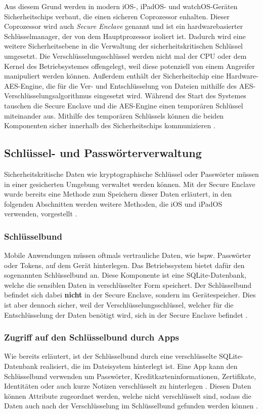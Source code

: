 Aus diesem Grund werden in modern iOS-, iPadOS- und watchOS-Geräten Sicherheitschips verbaut, die einen sicheren
Coprozessor enhalten. Dieser Coprozessor wird auch \textit{Secure Enclave} genannt und ist ein hardwarebasierter 
Schlüsselmanager, der von dem Hauptprozessor isoliert ist. Dadurch wird eine weitere Sicherheitsebene in die 
Verwaltung der sicherheitskritischen Schlüssel umgesetzt. Die Verschlüsselungsschlüssel werden nicht mal
der CPU oder dem Kernel des Betriebsystemes offengelegt, weil diese potenziell von einem Angreifer manipuliert
werden können. Außerdem enthält der Sicherheitschip eine Hardware-AES-Engine, die für die Ver- und Entschlüsselung
von Dateien mithilfe des AES-Verschlüsselungsalgorithmus eingesetzt wird. Während des Start des Systemes tauschen
die Secure Enclave und die AES-Engine einen temporären Schlüssel miteinander aus. Mithilfe des temporären Schlüssels
können die beiden Komponenten sicher innerhalb des Sicherheitschips
kommunizieren \cite{apple2020hardware_security,apple2020}.

\subsection{Schlüssel- und Passwörterverwaltung}
Sicherheitskritische Daten wie kryptographische Schlüssel oder Passwörter müssen in einer gesicherten Umgebung
verwaltet werden können. Mit der Secure Enclave wurde bereits eine Methode zum Speichern dieser Daten erläutert, 
in den folgenden Abschnitten werden weitere Methoden, die iOS und iPadOS
verwenden, vorgestellt \cite{apple2020}.

\subsubsection{Schlüsselbund}
Mobile Anwendungen müssen oftmals vertrauliche Daten, wie bspw. Passwörter oder Tokens, auf dem Gerät hinterlegen. 
Das Betriebssystem bietet dafür den sogenannten Schlüsselbund an. Diese Komponente ist eine SQLite-Datenbank,
welche die sensiblen Daten in verschlüsselter Form speichert. Der Schlüsselbund befindet sich dabei \textbf{nicht} in der
Secure Enclave, sondern im Gerätespeicher. Dies ist aber dennoch sicher, weil der Verschlüsselungsschlüssel, welcher
für die Entschlüsselung der Daten benötigt wird, sich in der Secure Enclave
befindet \cite{apple2020}.

\subsubsection{Zugriff auf den Schlüsselbund durch Apps}
Wie bereits erläutert, ist der Schlüsselbund durch eine verschlüsselte
SQLite-Datenbank realisiert, die im Dateisystem hinterlegt ist. Eine App kann
den Schlüsselbund verwenden um Passwörter, Kreditkarteninformationen,
Zertifikate, Identitäten oder auch kurze Notizen verschlüsselt zu hinterlegen
\cite{apple2020keychain_services}.  Diesen Daten können Attribute zugeordnet
werden, welche nicht verschlüsselt sind, sodass die Daten auch nach der
Verschlüsselung im Schlüsselbund gefunden werden können
\cite{apple2020keychain_items}. 

